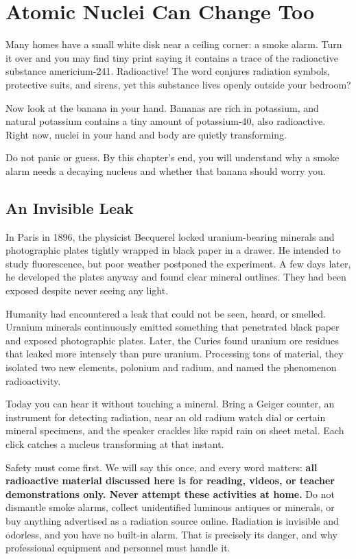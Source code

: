 \chapter{Atomic Nuclei Can Change Too}

\begin{kaichang}
Many homes have a small white disk near a ceiling corner: a smoke alarm. Turn it over and you may find tiny print saying it contains a trace of the radioactive substance americium-241. Radioactive! The word conjures radiation symbols, protective suits, and sirens, yet this substance lives openly outside your bedroom?

Now look at the banana in your hand. Bananas are rich in potassium, and natural potassium contains a tiny amount of potassium-40, also radioactive. Right now, nuclei in your hand and body are quietly transforming.

Do not panic or guess. By this chapter's end, you will understand why a smoke alarm needs a decaying nucleus and whether that banana should worry you.
\end{kaichang}

\section{An Invisible Leak}

In Paris in 1896, the physicist Becquerel locked uranium-bearing minerals and photographic plates tightly wrapped in black paper in a drawer. He intended to study fluorescence, but poor weather postponed the experiment. A few days later, he developed the plates anyway and found clear mineral outlines. They had been exposed despite never seeing any light.

Humanity had encountered a leak that could not be seen, heard, or smelled. Uranium minerals continuously emitted something that penetrated black paper and exposed photographic plates. Later, the Curies found uranium ore residues that leaked more intensely than pure uranium. Processing tons of material, they isolated two new elements, polonium and radium, and named the phenomenon radioactivity.

Today you can hear it without touching a mineral. Bring a Geiger counter, an instrument for detecting radiation, near an old radium watch dial or certain mineral specimens, and the speaker crackles like rapid rain on sheet metal. Each click catches a nucleus transforming at that instant.

Safety must come first. We will say this once, and every word matters: \textbf{all radioactive material discussed here is for reading, videos, or teacher demonstrations only. Never attempt these activities at home.} Do not dismantle smoke alarms, collect unidentified luminous antiques or minerals, or buy anything advertised as a radiation source online. Radiation is invisible and odorless, and you have no built-in alarm. That is precisely its danger, and why professional equipment and personnel must handle it.


